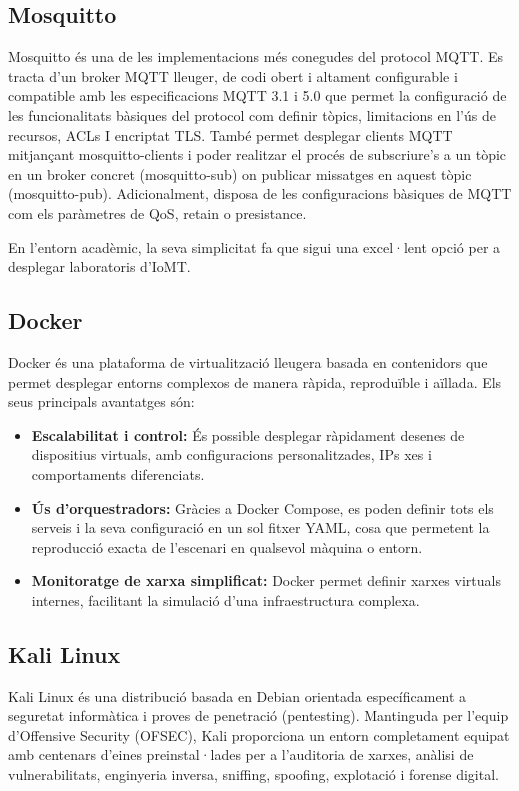    \subsection{Mosquitto}
    \label{sec:mosquitto}
      Mosquitto és una de les implementacions més conegudes del protocol MQTT. Es tracta d’un broker MQTT lleuger, de codi obert i altament configurable i compatible amb les especificacions MQTT 3.1 i 5.0 que permet la configuració de les funcionalitats bàsiques del protocol com definir tòpics, limitacions en l'ús de recursos, ACLs I encriptat TLS. També permet desplegar clients MQTT mitjançant mosquitto-clients i poder realitzar el procés de subscriure’s a un tòpic en un broker concret (mosquitto-sub) on publicar missatges en aquest tòpic (mosquitto-pub). Adicionalment, disposa de les configuracions bàsiques de MQTT com els paràmetres de QoS, retain o presistance. \cite{Mosquittoexp}

       En l’entorn acadèmic, la seva simplicitat fa que sigui una excel·lent opció per a desplegar laboratoris d’IoMT. 

    \subsection{Docker}
    \label{sec:docker}
    Docker és una plataforma de virtualització lleugera basada en contenidors que permet desplegar entorns complexos de manera ràpida, reproduïble i aïllada. Els seus principals avantatges són: \cite{dockerexp}
    \begin{itemize}  
      \item \textbf{Escalabilitat i control:} És possible desplegar ràpidament desenes de dispositius virtuals, amb configuracions personalitzades, IPs xes i comportaments diferenciats. 
      \item \textbf{Ús d'orquestradors:} Gràcies a Docker Compose, es poden definir tots els serveis i la seva configuració en un sol fitxer YAML, cosa que permetent la reproducció exacta de l’escenari en qualsevol màquina o entorn.
      \item \textbf{Monitoratge de xarxa simplificat:} Docker permet definir xarxes virtuals internes, facilitant la simulació d’una infraestructura complexa. 
    \end{itemize}

    \subsection{Kali Linux}
    Kali Linux és una distribució basada en Debian orientada específicament a seguretat informàtica i proves de penetració (pentesting). Mantinguda per l’equip d’Offensive Security (OFSEC), Kali proporciona un entorn completament equipat amb centenars d’eines preinstal·lades per a l’auditoria de xarxes, anàlisi de vulnerabilitats, enginyeria inversa, sniffing, spoofing, explotació i forense digital. \cite{kaliexp}
    
